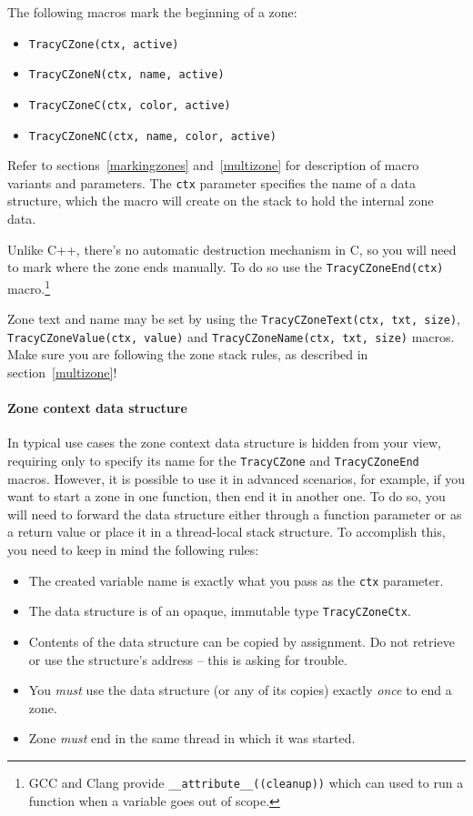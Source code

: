 \documentclass[hidelinks,titlepage,a4paper]{article}
\begin{document}
The following macros mark the beginning of a zone:

\begin{itemize}
\item \texttt{TracyCZone(ctx, active)}
\item \texttt{TracyCZoneN(ctx, name, active)}
\item \texttt{TracyCZoneC(ctx, color, active)}
\item \texttt{TracyCZoneNC(ctx, name, color, active)}
\end{itemize}

Refer to sections~\ref{markingzones} and~\ref{multizone} for description of macro variants and parameters. The \texttt{ctx} parameter specifies the name of a data structure, which the macro will create on the stack to hold the internal zone data.

Unlike C++, there's no automatic destruction mechanism in C, so you will need to mark where the zone ends manually. To do so use the \texttt{TracyCZoneEnd(ctx)} macro.\footnote{GCC and Clang provide \texttt{\_\_attribute\_\_((cleanup))} which can used to run a function when a variable goes out of scope.}

Zone text and name may be set by using the \texttt{TracyCZoneText(ctx, txt, size)}, \texttt{TracyCZoneValue(ctx, value)} and \texttt{TracyCZoneName(ctx, txt, size)} macros. Make sure you are following the zone stack rules, as described in section~\ref{multizone}!

\paragraph{Zone context data structure}
\label{zonectx}

In typical use cases the zone context data structure is hidden from your view, requiring only to specify its name for the \texttt{TracyCZone} and \texttt{TracyCZoneEnd} macros. However, it is possible to use it in advanced scenarios, for example, if you want to start a zone in one function, then end it in another one. To do so, you will need to forward the data structure either through a function parameter or as a return value or place it in a thread-local stack structure. To accomplish this, you need to keep in mind the following rules:

\begin{itemize}
\item The created variable name is exactly what you pass as the \texttt{ctx} parameter.
\item The data structure is of an opaque, immutable type \texttt{TracyCZoneCtx}.
\item Contents of the data structure can be copied by assignment. Do not retrieve or use the structure's address -- this is asking for trouble.
\item You \emph{must} use the data structure (or any of its copies) exactly \emph{once} to end a zone.
\item Zone \emph{must} end in the same thread in which it was started.
\end{itemize}
\end{document}
